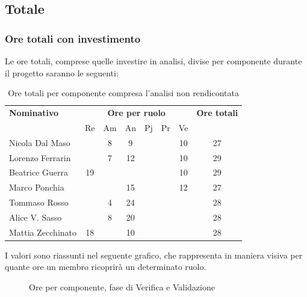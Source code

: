 \subsection{Totale}
\subsubsection{Ore totali con investimento}
Le ore totali, comprese quelle investire in analisi, divise per componente durante il progetto saranno le seguenti:

\begin{table}[H]
	\centering
	\begin{tabular}{|l|c|c|c|c|c|c|c|}
		\hline
		\textbf{Nominativo} & 
		\multicolumn{6}{c|}{\textbf{Ore per ruolo}} & 
		\textbf{Ore totali} \\
		& Re & Am & An & Pj & Pr & Ve & \\
		\hline
		Nicola Dal Maso & & 8 & 9 & & & 10 & 27 \\
		Lorenzo Ferrarin & & 7 & 12 & & & 10 & 29 \\
		Beatrice Guerra & 19 & & & & & 10 & 29 \\
		Marco Ponchia & & & 15 & & & 12 & 27 \\
		Tommaso Rosso & & 4 & 24 & & & & 28 \\
		Alice V. Sasso & & 8 & 20 & & & & 28 \\
		Mattia Zecchinato & 18 & & 10 & & & & 28 \\
		\hline
	\end{tabular}
	\caption{Ore totali per componente compresa l'analisi non rendicontata}
\end{table}
I valori sono riassunti nel seguente grafico, che rappresenta in maniera visiva per quante ore un membro ricoprirà un determinato ruolo.
\begin{figure}[H]
	\centering
	\caption{Ore per componente, fase di Verifica e Validazione}
\end{figure}

